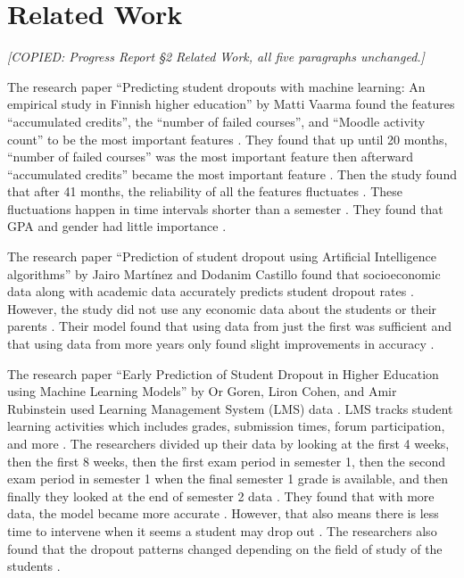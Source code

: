 \documentclass[11pt]{article}
\newcommand{\copynote}[1]{{\color{blue}\textit{[COPIED: #1]}}}
\newcommand{\copynote}[1]{}
\begin{document}
\section{Related Work}
\copynote{Progress Report \S2 Related Work, all five paragraphs unchanged.}

The research paper ``Predicting student dropouts with machine learning: An empirical study in Finnish higher education'' by Matti Vaarma found the features ``accumulated credits'', the ``number of failed courses'', and ``Moodle activity count'' to be the most important features \citep{vaarma2024}. They found that up until 20 months, ``number of failed courses'' was the most important feature then afterward ``accumulated credits'' became the most important feature \citep{vaarma2024}. Then the study found that after 41 months, the reliability of all the features fluctuates \citep{vaarma2024}. These fluctuations happen in time intervals shorter than a semester \citep{vaarma2024}. They found that GPA and gender had little importance \citep{vaarma2024}.

The research paper ``Prediction of student dropout using Artificial Intelligence algorithms'' by Jairo Martínez and Dodanim Castillo found that socioeconomic data along with academic data accurately predicts student dropout rates \citep{martínez2024}. However, the study did not use any economic data about the students or their parents \citep{martínez2024}. Their model found that using data from just the first was sufficient and that using data from more years only found slight improvements in accuracy \citep{martínez2024}.

The research paper ``Early Prediction of Student Dropout in Higher Education using Machine Learning Models'' by Or Goren, Liron Cohen, and Amir Rubinstein used Learning Management System (LMS) data \citep{goren2024}. LMS tracks student learning activities which includes grades, submission times, forum participation, and more \citep{goren2024}. The researchers divided up their data by looking at the first 4 weeks, then the first 8 weeks, then the first exam period in semester 1, then the second exam period in semester 1 when the final semester 1 grade is available, and then finally they looked at the end of semester 2 data \citep{goren2024}. They found that with more data, the model became more accurate \citep{goren2024}. However, that also means there is less time to intervene when it seems a student may drop out \citep{goren2024}. The researchers also found that the dropout patterns changed depending on the field of study of the students \citep{goren2024}.
\end{document}
